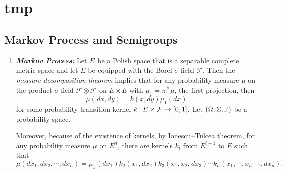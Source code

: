 \chapter{tmp}

\section{Markov Process and Semigroups}

\begin{enumerate}[label=\arabic{*}.]
	\item \emph{\textbf{Markov Process:}} Let $E$ be a Polish space that is a separable complete metric space and let $E$ be equipped with the Borel $\sigma$-field $\mathcal{F}$. Then the \emph{measure decomposition theorem} implies that for any probability measure $\mu$ on the product $\sigma$-field $\mathcal{F} \otimes \mathcal{F}$ on $E \times E$ with $\mu_1 = \pi_1^{\#}\mu$, the first projection, then
	\begin{equation*}
	    \mu (dx,dy) = k(x,dy)\mu_1(dx)
	\end{equation*}
	for some probability transition kernel $k \colon E \times \mathcal{F} \rightarrow [0,1]$. Let $(\Omega,\Sigma,\mathbb{P})$ be a probability space.
	\begin{rmk}
	    Moreover, because of the existence of kernels, by Ionescu–Tulcea theorem, for any probability measure $\mu$ on $E^n$, there are kernels $k_i$ from $E^{i-1}$ to $E$ such that
	    \begin{equation*}
	    	\mu(dx_1,dx_2,\cdots,dx_n) = \mu_1(dx_1)k_2(x_1,dx_2)k_3(x_1,x_2,dx_3)\cdots k_n(x_1,\cdots,x_{n-1},dx_n).
	    \end{equation*}
	\end{rmk}


\end{enumerate}
